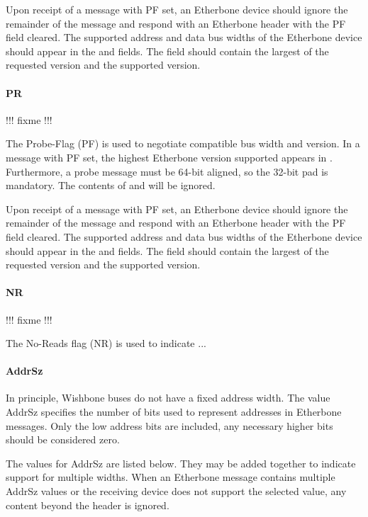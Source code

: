 \documentclass{article}
\begin{document}
Upon receipt of a message with PF set, 
an Etherbone device should ignore the remainder of the message
and respond with an Etherbone header with the PF field cleared.
The supported address and data bus widths of the Etherbone
device should appear in the  and  fields.
The  field should contain the largest of the
requested version and the supported version.

\paragraph{PR} \label{field:PR}

!!! fixme !!!

The Probe-Flag (PF) is used to negotiate compatible bus width and version.
In a message with PF set,
the highest Etherbone version supported appears in .
Furthermore, a probe message must be 64-bit aligned, so the 32-bit pad is mandatory.
The contents of  and  will be ignored.

Upon receipt of a message with PF set, 
an Etherbone device should ignore the remainder of the message
and respond with an Etherbone header with the PF field cleared.
The supported address and data bus widths of the Etherbone
device should appear in the  and  fields.
The  field should contain the largest of the
requested version and the supported version.

\paragraph{NR} \label{field:NR}

!!! fixme !!!

The No-Reads flag (NR) is used to indicate ...

\paragraph{AddrSz} \label{field:AddrSz}

In principle, 
Wishbone buses do not have a fixed address width.
The value AddrSz specifies the number of bits used 
to represent addresses in Etherbone messages.
Only the low address bits are included,
any necessary higher bits should be considered zero.

The values for AddrSz are listed below.
They may be added together to indicate support for multiple widths.
When an Etherbone message contains multiple AddrSz values
or the receiving device does not support the selected value, 
any content beyond the header is ignored.
\end{document}

